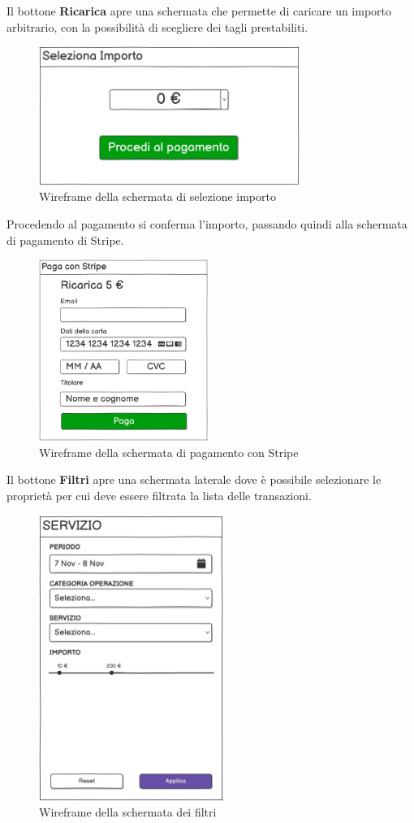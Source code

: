 Il bottone \textbf{Ricarica} apre una schermata che permette di caricare un importo arbitrario, con la possibilit\`a di scegliere
dei tagli prestabiliti.

\begin{figure}[H]
  \centering
  \includegraphics[width=8.5cm]{images/gestione-wallet/mock-seleziona-importo.png}
  \caption{Wireframe della schermata di selezione importo }
\end{figure}
Procedendo al pagamento si conferma l'importo, passando quindi alla schermata di pagamento di Stripe.

\begin{figure}[H]
  \centering
  \includegraphics[width=5.5cm]{images/gestione-wallet/mock-stripe.png}
  \caption{Wireframe della schermata di pagamento con Stripe }
\end{figure}

Il bottone \textbf{Filtri} apre una schermata laterale dove \`e possibile selezionare le propriet\`a per cui deve essere filtrata la lista delle transazioni.

\begin{figure}[H]
  \centering
  \includegraphics[width=6cm]{images/gestione-wallet/mock-filtri-ricerca.png}
  \caption{Wireframe della schermata dei filtri}
\end{figure}

